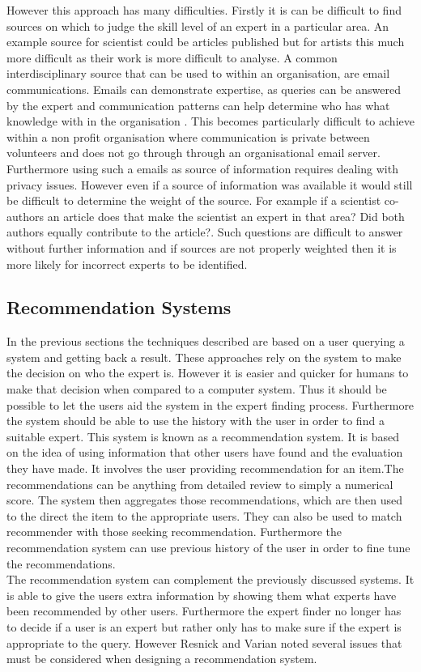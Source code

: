 \documentclass[a4paper,oneside,11pt]{report}
\begin{document}
However this approach has many difficulties. Firstly it is can be difficult to find sources on which to judge the skill level of an expert in a particular area. An example source for scientist could be articles published but for artists this much more difficult as their work is more difficult to analyse. A common interdisciplinary source that can be used to within an organisation, are email communications. Emails can demonstrate expertise, as queries can be answered by the expert and communication patterns can help determine who has what knowledge with in the organisation \autocite{campbell2003}. This becomes particularly difficult to achieve within a non profit organisation where communication is private between volunteers and does not go through through an organisational email server. Furthermore using such a emails as source of information requires dealing with privacy issues.
However even if a source of information was available it would still be difficult to determine the weight of the source. For example if a scientist co-authors an article does that make the scientist an expert in that area? Did both authors equally contribute to the article?. Such questions are difficult to answer without further information and if sources are not properly weighted then it is more likely for incorrect experts to be identified.

\subsection{Recommendation Systems}
In the previous sections the techniques described are based on a user querying a system and getting back a result. These approaches rely on the system to make the decision on who the expert is. However it is easier and quicker for humans to make that decision when compared to a computer system. Thus it should be possible to let the users aid the system in the expert finding process. Furthermore the system should be able to use the history with the user in order to find a suitable expert. This system is known as a recommendation system. It is based on the idea of using information that other users have found and the evaluation they have made. It involves the user providing recommendation for an item.The recommendations can be anything from detailed review to simply a numerical score. The system then aggregates those recommendations, which are then used to the direct the item to the appropriate users. They can also be used to match recommender with those seeking recommendation. Furthermore the recommendation system can use previous history of the user in order to fine tune the recommendations.
\\ 
The recommendation system can complement the previously discussed systems. It is able to give the users extra information by showing them what experts have been recommended by other users. Furthermore the expert finder no longer has to decide if a user is an expert but rather only has to make sure if the expert is appropriate to the query.  However Resnick and Varian \autocite{resnick} noted several issues that must be considered when designing a recommendation system.
\end{document}
